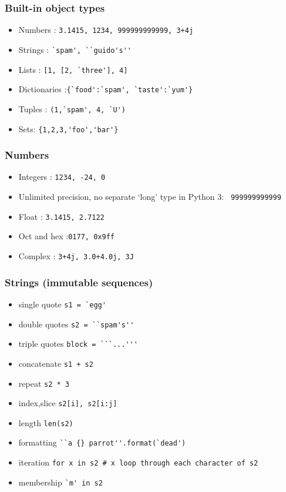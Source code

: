 \begin{frame}[fragile]\frametitle{Built-in object types}
  \begin{itemize}
  \item Numbers : \lstinline{3.1415, 1234, 999999999999, 3+4j}
  \item Strings : \lstinline{`spam', ``guido's''}
  \item Lists : \lstinline{[1, [2, `three'], 4]}
   \item Dictionaries :\lstinline|{`food':`spam', `taste':`yum'}|
  \item Tuples : \lstinline{(1,`spam', 4, `U')}
  \item Sets: \lstinline|{1,2,3,'foo','bar'}|
  \end{itemize}
\end{frame}

\begin{frame}[fragile]\frametitle{Numbers}
  \begin{itemize}
  \item Integers : \lstinline{1234, -24, 0}
  \item Unlimited precision, no separate `long' type in Python 3: \lstinline{ 999999999999}
  \item Float : \lstinline{3.1415, 2.7122}
   \item Oct and hex :\lstinline|0177, 0x9ff|
  \item Complex : \lstinline{3+4j, 3.0+4.0j, 3J}
  \end{itemize}
\end{frame}

\begin{frame}[fragile]\frametitle{Strings (immutable sequences)}
  \begin{itemize}
  \item single quote \lstinline{s1 = `egg'}
\item double quotes \lstinline{s2 = ``spam's''}
\item triple quotes \lstinline{block = ```...'''}
\item concatenate \lstinline{s1 + s2}
\item repeat \lstinline{s2 * 3}
\item index,slice \lstinline{s2[i], s2[i:j]}
\item length \lstinline{len(s2)}
\item formatting \lstinline|``a {} parrot''.format(`dead')|
\item iteration \lstinline{for x in s2 # x loop through each character of s2}
\item membership \lstinline{`m' in s2}
  \end{itemize}
\end{frame}

